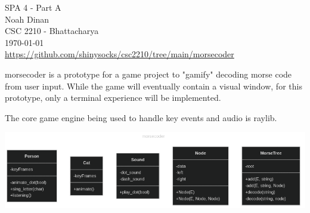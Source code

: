 \documentclass[12pt]{article}
\begin{document}
\setlength{\parindent}{0in}
SPA 4 - Part A \\ Noah Dinan \\ CSC 2210 - Bhattacharya \\ \today \\
\url{https://github.com/shinysocks/csc2210/tree/main/morsecoder}

\vspace{0.5in}


morsecoder is a prototype for a game project to "gamify" decoding morse code from user input.
While the game will eventually contain a visual window, for this prototype, only a terminal
experience will be implemented.

The core game engine being used to handle key events and audio is raylib.

\begin{center}
    \includegraphics[scale=0.5]{o-1.png}
\end{center}
\end{document}
